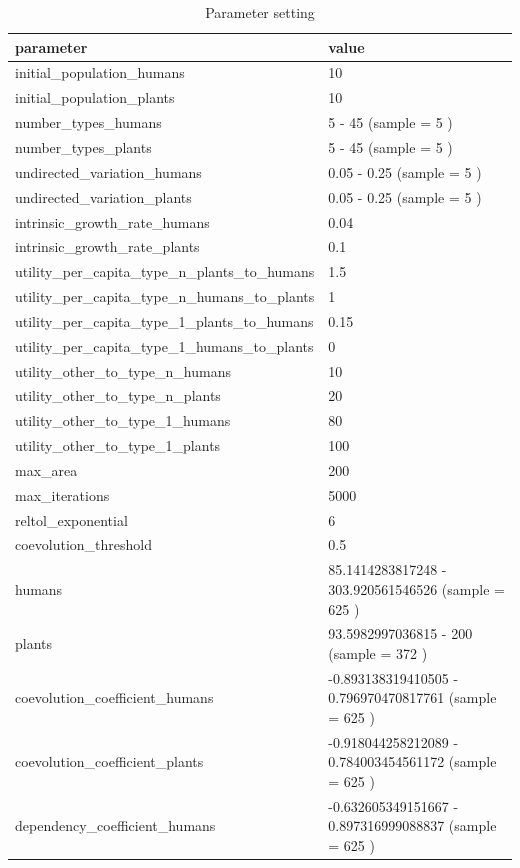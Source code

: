 \documentclass[
]{book}
\begin{document}
\begin{table}[!h]

\caption{\label{tab:4nvtablepdf}Parameter setting}
\centering
\begin{tabular}[t]{l|l}
\hline
parameter & value\\
\hline
initial\_population\_humans & 10\\
\hline
initial\_population\_plants & 10\\
\hline
number\_types\_humans & 5 - 45 (sample = 5 )\\
\hline
number\_types\_plants & 5 - 45 (sample = 5 )\\
\hline
undirected\_variation\_humans & 0.05 - 0.25 (sample = 5 )\\
\hline
undirected\_variation\_plants & 0.05 - 0.25 (sample = 5 )\\
\hline
intrinsic\_growth\_rate\_humans & 0.04\\
\hline
intrinsic\_growth\_rate\_plants & 0.1\\
\hline
utility\_per\_capita\_type\_n\_plants\_to\_humans & 1.5\\
\hline
utility\_per\_capita\_type\_n\_humans\_to\_plants & 1\\
\hline
utility\_per\_capita\_type\_1\_plants\_to\_humans & 0.15\\
\hline
utility\_per\_capita\_type\_1\_humans\_to\_plants & 0\\
\hline
utility\_other\_to\_type\_n\_humans & 10\\
\hline
utility\_other\_to\_type\_n\_plants & 20\\
\hline
utility\_other\_to\_type\_1\_humans & 80\\
\hline
utility\_other\_to\_type\_1\_plants & 100\\
\hline
max\_area & 200\\
\hline
max\_iterations & 5000\\
\hline
reltol\_exponential & 6\\
\hline
coevolution\_threshold & 0.5\\
\hline
humans & 85.1414283817248 - 303.920561546526 (sample = 625 )\\
\hline
plants & 93.5982997036815 - 200 (sample = 372 )\\
\hline
coevolution\_coefficient\_humans & -0.893138319410505 - 0.796970470817761 (sample = 625 )\\
\hline
coevolution\_coefficient\_plants & -0.918044258212089 - 0.784003454561172 (sample = 625 )\\
\hline
dependency\_coefficient\_humans & -0.632605349151667 - 0.897316999088837 (sample = 625 )\\

\end{tabular}
\end{table}
\end{document}
